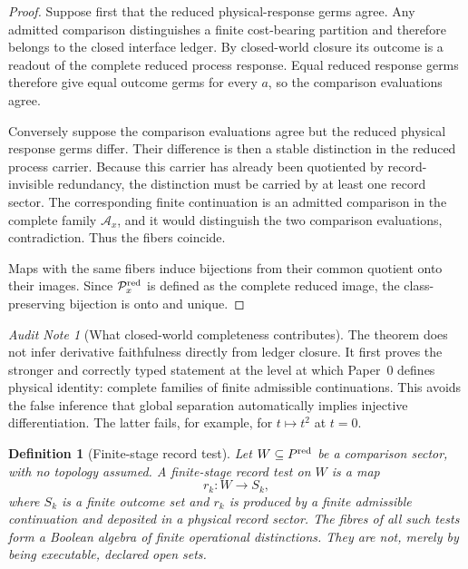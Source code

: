 \documentclass[11pt]{article}
\newtheorem{definition}[theorem]{Definition}
\theoremstyle{remark}
\newtheorem{audit}[theorem]{Audit Note}
\begin{document}
\begin{proof}
Suppose first that the reduced physical-response germs agree.  Any admitted
comparison distinguishes a finite cost-bearing partition and therefore belongs
to the closed interface ledger.  By closed-world closure its outcome is a
readout of the complete reduced process response.  Equal reduced response germs
therefore give equal outcome germs for every $a$, so the comparison evaluations
agree.

Conversely suppose the comparison evaluations agree but the reduced physical
response germs differ.  Their difference is then a stable distinction in the
reduced process carrier.  Because this carrier has already been quotiented by
record-invisible redundancy, the distinction must be carried by at least one
record sector.  The corresponding finite continuation is an admitted
comparison in the complete family $\mathcal A_x$, and it would distinguish the
two comparison evaluations, contradiction.  Thus the fibers coincide.

Maps with the same fibers induce bijections from their common quotient onto
their images.  Since $\mathcal P_x^{\rm red}$ is defined as the complete reduced
image, the class-preserving bijection is onto and unique.
\end{proof}

\begin{audit}[What closed-world completeness contributes]
The theorem does not infer derivative faithfulness directly from ledger
closure.  It first proves the stronger and correctly typed statement at the
level at which Paper~0 defines physical identity: complete families of finite
admissible continuations.  This avoids the false inference that global
separation automatically implies injective differentiation.  The latter fails,
for example, for $t\mapsto t^2$ at $t=0$.
\end{audit}



\begin{definition}[Finite-stage record test]
\label{def:finite-stage-record-test}
Let $W\subseteq P^{\rm red}$ be a comparison sector, with no topology assumed.
A \emph{finite-stage record test} on $W$ is a map
\[
        r_k:W\longrightarrow S_k,
\]
where $S_k$ is a finite outcome set and $r_k$ is produced by a finite
admissible continuation and deposited in a physical record sector.  The fibres
of all such tests form a Boolean algebra of finite operational distinctions.
They are not, merely by being executable, declared open sets.
\end{definition}
\end{document}
